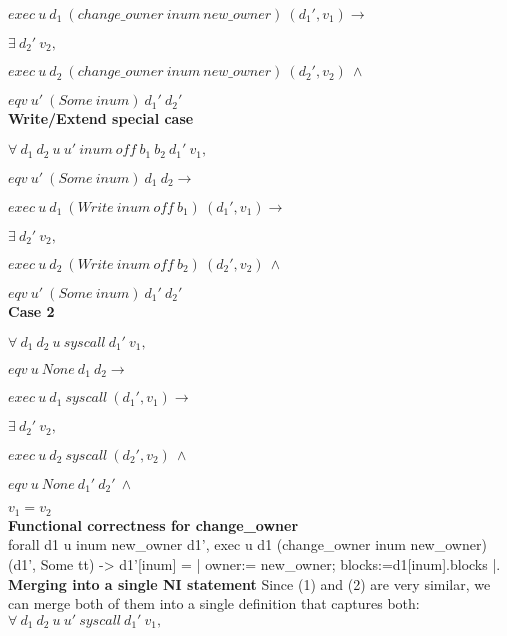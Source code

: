 \documentclass[onecolumn]{paper}
\begin{document}
			$exec\ u\ d_1\ (change\_owner\ inum\ new\_owner)\ (d_1', v_1) \rightarrow$
			
			$\exists\ d_2'\ v_2,$
			
			$exec\ u\ d_2\ (change\_owner\ inum\ new\_owner)\ (d_2', v_2)\ \wedge$
			
			$eqv\ u'\ (Some\ inum)\ d_1'\ d_2'$\\
			
			
			{\bf Write/Extend special case}
			
			$\forall\ d_1\ d_2\ u\ u'\ inum\ off\ b_1\ b_2\ d_1'\ v_1,$
			
			$eqv\ u'\ (Some\ inum)\ d_1\ d_2 \rightarrow$
			
			$exec\ u\ d_1\ (Write\ inum\ off\ b_1)\ (d_1', v_1) \rightarrow$
			
			$\exists\ d_2'\ v_2,$
			
			$exec\ u\ d_2\ (Write\ inum\ off\ b_2)\ (d_2', v_2)\ \wedge$
			
			$eqv\ u'\ (Some\ inum)\ d_1'\ d_2'$\\
			
			
			{\bf Case 2}
			 
			 $\forall\ d_1\ d_2\ u\ syscall\ d_1'\ v_1,$
			 
			 $eqv\ u\ None\ d_1\ d_2 \rightarrow$
			 
			 $exec\ u\ d_1\ syscall\ (d_1', v_1) \rightarrow$
			 
			 $\exists\ d_2'\ v_2,$
			 
			 $exec\ u\ d_2\ syscall\ (d_2', v_2)\ \wedge$
			 
			 $eqv\ u\ None\ d_1'\ d_2'\ \wedge$
			 
			 $v_1 = v_2$\\
			
			
			{\bf Functional correctness for change\_owner}\\
			forall d1 u inum new\_owner d1',
			exec u d1 (change\_owner inum new\_owner) (d1', Some tt) ->
			d1'[inum] = {| owner:= new\_owner; blocks:=d1[inum].blocks |}.\\
			
			
			
			{\bf Merging into a single NI statement}
			Since (1) and (2) are very similar, we can merge both of them into a single definition that captures both:\\
			
			$\forall\ d_1\ d_2\ u\ u'\ syscall\ d_1'\ v_1,$
			
\end{document}
